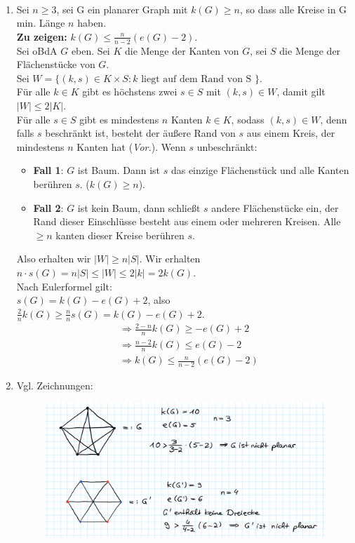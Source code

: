 \begin{solution}
\
\begin{enumerate}[label=(\alph*)] 
  \item Sei \( n \geq 3 \), sei G ein planarer Graph mit \( k(G) \geq n \), so dass alle Kreise in G min. Länge \( n \) haben. \\
  \textbf{Zu zeigen:} \( k(G) \leq \frac{n}{n-2}(e(G) - 2) \). \\
  Sei oBdA \( G \) eben. Sei \( K \) die Menge der Kanten von \( G \), sei \( S \) die Menge der Flächenstücke von \( G \). \\
  Sei \( W = \{ (k,s) \in K \times S : k \text{ liegt auf dem Rand von S } \} \). \\
  Für alle \( k \in K \) gibt es höchstens zwei \( s \in S \) mit \( (k,s) \in W \), damit gilt \( \vert W \vert \leq 2 \vert K \vert \). \\
  Für alle \( s \in S \) gibt es mindestens \( n \) Kanten \( k \in K \), sodass \( (k,s) \in W \), denn falls \( s \) beschränkt ist, besteht der äußere Rand von \( s \) aus einem Kreis, der mindestens \( n \) Kanten hat (\emph{Vor.}). Wenn \( s \) unbeschränkt:
  \begin{itemize}
    \item \textbf{Fall 1}: \( G \) ist Baum. Dann ist \( s \) das einzige Flächenstück und alle Kanten berühren \( s \). (\( k(G) \geq n \)).
    \item \textbf{Fall 2}: \( G \) ist kein Baum, dann schließt \( s \) andere Flächenstücke ein, der Rand dieser Einschlüsse besteht aus einem oder mehreren Kreisen. Alle \( \geq n \) kanten dieser Kreise berühren \( s \).
  \end{itemize} 
  Also erhalten wir \( \vert W \vert \geq n \vert S \vert \). Wir erhalten \( n \cdot s(G) = n\vert S \vert \leq \vert W \vert \leq 2 \vert k \vert = 2k(G) \). \\
  Nach Eulerformel gilt: \\
  \( s(G) = k(G) - e(G) + 2 \), also \( \frac{2}{n}k(G) \geq \frac{n}{n} s(G) = k(G) - e(G) + 2 \).
  \begin{align*}
    &\Rightarrow \frac{2-n}{n}k(G) \geq - e(G) + 2 \\
    &\Rightarrow \frac{n-2}{n}k(G) \leq e(G) - 2 \\
    &\Rightarrow k(G) \leq \frac{n}{n-2}(e(G) - 2)
  \end{align*}
  \item Vgl. Zeichnungen:
  \begin{figure}[H]
    \includegraphics[width=\linewidth]{assets/images/Abb1-15-12.png}

\end{figure}
\end{enumerate}
\end{solution}
